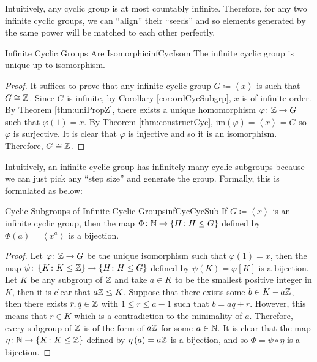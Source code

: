 \documentclass[math]{amznotes}
\theoremstyle{remark}
\newcommand{\img}[1]{\mathrm{im}\left(#1\right)}
\newcommand{\0}{\mathbf{0}}
\newcommand{\1}{\mathbf{1}}
\begin{document}
Intuitively, any cyclic group is at most countably infinite. Therefore, for any two infinite cyclic groups, we can ``align'' their ``seeds'' and so elements generated by the same power will be matched to each other perfectly.
\begin{corbox}{Infinite Cyclic Groups Are Isomorphic}{infCycIsom}
    The infinite cyclic group is unique up to isomorphism. 
    \tcblower
    \begin{proof}
        It suffices to prove that any infinite cyclic group $G \coloneqq \left\langle x \right\rangle$ is such that $G \cong \mathbb{Z}$. Since $G$ is infinite, by Corollary \ref{cor:ordCycSubgrp}, $x$ is of infinite order. By Theorem \ref{thm:uniPropZ}, there exists a unique homomorphism $\varphi \colon \mathbb{Z} \to G$ such that $\varphi\left(1\right) = x$. By Theorem \ref{thm:constructCyc}, $\img{\varphi} = \left\langle x \right\rangle = G$ so $\varphi$ is surjective. It is clear that $\varphi$ is injective and so it is an isomorphism. Therefore, $G \cong \mathbb{Z}$.
    \end{proof}
\end{corbox}
Intuitively, an infinite cyclic group has infinitely many cyclic subgroups because we can just pick any ``step size'' and generate the group. Formally, this is formulated as below:
\begin{probox}{Cyclic Subgroups of Infinite Cyclic Groups}{infCycCycSub}
    If $G \coloneqq \left\langle x \right\rangle$ is an infinite cyclic group, then the map $\Phi \colon \mathbb{N} \to \left\{H \colon H \leq G\right\}$ defined by $\Phi\left(a\right) = \left\langle x^a \right\rangle$ is a bijection.
    \tcblower
    \begin{proof}
        Let $\varphi \colon \mathbb{Z} \to G$ be the unique isomorphism such that $\varphi\left(1\right) = x$, then the map $\psi \colon \left\{K \colon K \leq \mathbb{Z}\right\} \to \left\{H \colon H \leq G\right\}$ defined by $\psi\left(K\right) = \varphi\left[K\right]$ is a bijection. Let $K$ be any subgroup of $\mathbb{Z}$ and take $a \in K$ to be the smallest positive integer in $K$, then it is clear that $a\mathbb{Z} \leq K$. Suppose that there exists some $b \in K - a\mathbb{Z}$, then there exists $r, q \in \mathbb{Z}$ with $1 \leq r \leq a - 1$ such that $b = aq + r$. However, this means that $r \in K$ which is a contradiction to the minimality of $a$. Therefore, every subgroup of $\mathbb{Z}$ is of the form of $a\mathbb{Z}$ for some $a \in \mathbb{N}$. It is clear that the map $\eta \colon \mathbb{N} \to \left\{K \colon K \leq \mathbb{Z}\right\}$ defined by $\eta\left(a\right) = a\mathbb{Z}$ is a bijection, and so $\Phi = \psi \circ \eta$ is a bijection.
    \end{proof}
\end{probox}
\end{document}
